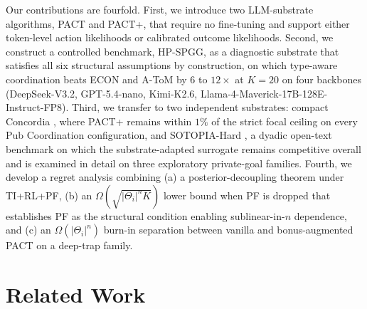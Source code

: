 \documentclass{article}
\def\textsuperscript#1{#1}%
\begin{document}
Our contributions are fourfold. First, we introduce two LLM-substrate algorithms, PACT and PACT\textsuperscript{+}, that require no fine-tuning and support either token-level action likelihoods or calibrated outcome likelihoods. Second, we construct a controlled benchmark, HP-SPGG, as a diagnostic substrate that satisfies all six structural assumptions by construction, on which type-aware coordination beats ECON \citep{xie2025debate} and A-ToM \citep{mu2026adaptive} by $6$ to $12\times$ at $K{=}20$ on four backbones (DeepSeek-V3.2, GPT-5.4-nano, Kimi-K2.6, Llama-4-Maverick-17B-128E-Instruct-FP8). Third, we transfer to two independent substrates: compact Concordia \citep{vezhnevets2023concordia}, where PACT\textsuperscript{+} remains within $1\%$ of the strict focal ceiling on every Pub Coordination configuration, and SOTOPIA-Hard \citep{zhou2024sotopia}, a dyadic open-text benchmark on which the substrate-adapted surrogate remains competitive overall and is examined in detail on three exploratory private-goal families. Fourth, we develop a regret analysis combining (a) a posterior-decoupling theorem under TI+RL+PF, (b) an $\Omega(\sqrt{|\Theta_i|^n K})$ lower bound when PF is dropped that establishes PF as the structural condition enabling sublinear-in-$n$ dependence, and (c) an $\Omega(|\Theta_i|^n)$ burn-in separation between vanilla and bonus-augmented PACT on a deep-trap family.

\section{Related Work}
\label{sec:related}
\end{document}
